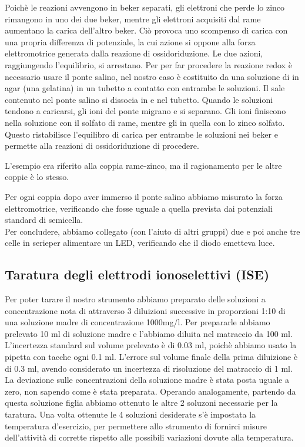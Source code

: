 Poichè le reazioni avvengono in beker separati, gli elettroni che perde lo zinco rimangono in uno dei due beker, mentre gli elettroni acquisiti dal rame aumentano la carica dell'altro beker.
Ciò provoca uno scompenso di carica con una propria differenza di potenziale, la cui azione si oppone alla forza elettromotrice generata dalla reazione di ossidoriduzione. Le due azioni, raggiungendo l'equilibrio, si arrestano.
Per per far procedere la reazione redox è necessario usare il ponte salino, nel nostro caso è costituito da una soluzione di  in agar (una gelatina) in un tubetto a contatto con entrambe le soluzioni.
Il sale contenuto nel ponte salino si dissocia in  e  nel tubetto.
Quando le soluzioni tendono a caricarsi, gli ioni del ponte migrano e si separano.
Gli ioni  finiscono nella soluzione con il solfato di rame, mentre gli  in quella con lo zinco solfato.
Questo ristabilisce l'equilibro di carica per entrambe le soluzioni nei beker e permette alla reazioni di ossidoriduzione di procedere.

L'esempio era riferito alla coppia rame-zinco, ma il ragionamento per le altre coppie è lo stesso.

Per ogni coppia dopo aver immerso il ponte salino abbiamo misurato la forza elettromotrice, verificando che fosse uguale a quella prevista dai potenziali standard di semicella.
\\

Per concludere, abbiamo collegato (con l'aiuto di altri gruppi) due e poi anche tre celle in serieper alimentare un LED, verificando che il diodo emetteva luce.

\subsection*{Taratura degli elettrodi ionoselettivi (ISE)}

Per poter tarare il nostro strumento abbiamo preparato delle soluzioni a concentrazione nota di  attraverso 3 diluizioni successive in proporzioni 1:10 di una soluzione madre di concentrazione 1000mg/l. 
Per prepararle abbiamo prelevato 10 ml di soluzione madre e l'abbiamo diluita nel matraccio da 100 ml.%
L'incertezza standard sul volume prelevato è di 0.03 ml, poichè abbiamo usato la pipetta con tacche ogni 0.1 ml.
L'errore sul volume finale della prima diluizione è di 0.3 ml, avendo considerato un incertezza di risoluzione del matraccio di 1 ml.
La deviazione sulle concentrazioni della soluzione madre è stata posta uguale a zero, non sapendo come è stata preparata.
Operando analogamente, partendo da questa soluzione figlia abbiamo ottenuto le altre 2 soluzoni necessarie per la taratura. 
Una volta ottenute le 4 soluzioni desiderate s'è impostata la temperatura d'esercizio, per permettere allo strumento di fornirci misure dell'attività di  corrette rispetto alle possibili variazioni dovute alla temperatura.